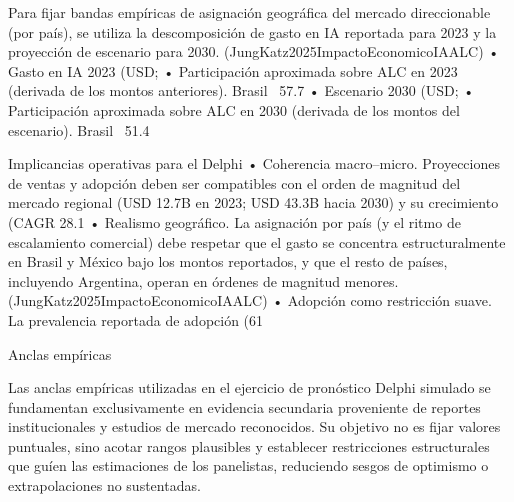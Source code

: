 \begin{APACode}
Para fijar bandas empíricas de asignación geográfica del mercado direccionable (por país), se utiliza la descomposición de gasto en IA reportada para 2023 y la proyección de escenario para 2030. (JungKatz2025ImpactoEconomicoIAALC)
	•	Gasto en IA 2023 (USD; %
	•	Participación aproximada sobre ALC en 2023 (derivada de los montos anteriores). Brasil ~57.7%
	•	Escenario 2030 (USD; %
	•	Participación aproximada sobre ALC en 2030 (derivada de los montos del escenario). Brasil ~51.4%

Implicancias operativas para el Delphi
	•	Coherencia macro–micro. Proyecciones de ventas y adopción deben ser compatibles con el orden de magnitud del mercado regional (USD 12.7B en 2023; USD 43.3B hacia 2030) y su crecimiento (CAGR 28.1%
	•	Realismo geográfico. La asignación por país (y el ritmo de escalamiento comercial) debe respetar que el gasto se concentra estructuralmente en Brasil y México bajo los montos reportados, y que el resto de países, incluyendo Argentina, operan en órdenes de magnitud menores. (JungKatz2025ImpactoEconomicoIAALC)
	•	Adopción como restricción suave. La prevalencia reportada de adopción (61%



Anclas empíricas

Las anclas empíricas utilizadas en el ejercicio de pronóstico Delphi simulado se fundamentan exclusivamente en evidencia secundaria proveniente de reportes institucionales y estudios de mercado reconocidos. Su objetivo no es fijar valores puntuales, sino acotar rangos plausibles y establecer restricciones estructurales que guíen las estimaciones de los panelistas, reduciendo sesgos de optimismo o extrapolaciones no sustentadas.


\end{APACode}
